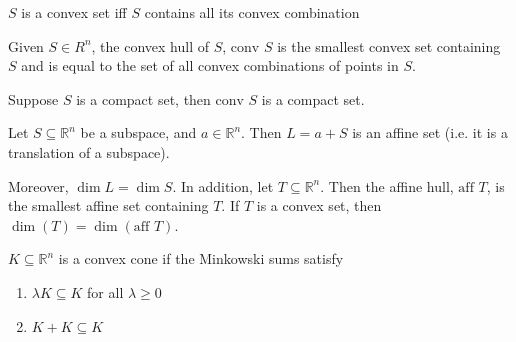 \begin{lemma}
    $S$ is a convex set iff $S$ contains all its convex combination
\end{lemma}
\begin{definition}
    Given $S\in R^n$, the convex hull of $S$, $\text{conv }S$ is the smallest convex set containing $S$ and is equal to the set of all convex combinations of points in $S$.
\end{definition}

\begin{lemma}
    Suppose $S$ is a compact set, then $\text{conv }S$ is a compact set.
\end{lemma}
\begin{definition}
    Let $S \subseteq \mathbb R^n$ be a subspace, and $a \in \mathbb R^n$. Then $L = a + S$ is an affine set (i.e. it is a translation of a subspace).

    Moreover, $\dim L = \dim S$. In addition, let $T \subseteq \mathbb R^n$. Then the affine hull, $\text{aff }T$, is the smallest affine set containing $T$. If $T$ is a convex set, then $\dim(T) = \dim(\text{aff }T)$.
\end{definition}
\begin{definition}
    $K \subseteq \mathbb R^n$ is a convex cone if the Minkowski sums satisfy
    \begin{enumerate}
        \item $\lambda K \subseteq K$ for all $\lambda \geq 0$
        \item $K + K \subseteq K$
    \end{enumerate}
\end{definition}